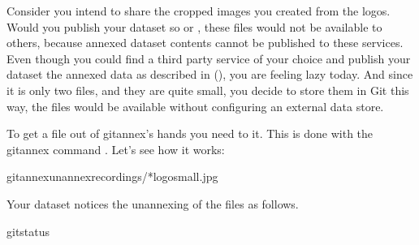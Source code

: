 \sphinxAtStartPar
Consider you intend to share the cropped  images you created from the
 logos. Would you publish your  dataset so {\hyperref[\detokenize{glossary:term-GitHub}]{}}
or {\hyperref[\detokenize{glossary:term-GitLab}]{}}, these files would not be available to others, because annexed
dataset contents cannot be published to these services.
Even though you could find a third party service of your choice
and publish your dataset  the annexed data as described in  {\hyperref[\detokenize{basics/101-138-sharethirdparty:sharethirdparty}]{}} (),
you are feeling lazy today. And since it
is only two files, and they are quite small, you decide to store them in Git \textendash{}
this way, the files would be available without configuring an external data
store.

\sphinxAtStartPar
To get a file out of git\sphinxhyphen{}annex’s hands you need to  it. This is
done with the git\sphinxhyphen{}annex command . Let’s see how it
works:

\begin{sphinxVerbatim}[commandchars=\\\{\}]
gitannexunannexrecordings/*logo\PYGZus{}small.jpg
\end{sphinxVerbatim}

\sphinxAtStartPar
Your dataset notices the unannexing of the files as follows.

\begin{sphinxVerbatim}[commandchars=\\\{\}]
gitstatus

\end{sphinxVerbatim}

